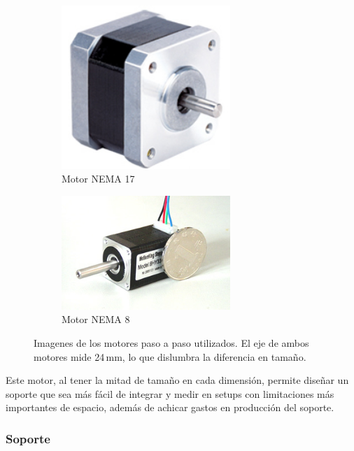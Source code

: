 \begin{figure}[H]
    \begin{subfigure}[b]{0.45\textwidth}
        \centering
        \includegraphics[width=0.7\textwidth]{fig/motor/nema17}
        \caption{Motor NEMA 17}
    \end{subfigure}
    \begin{subfigure}[b]{0.45\textwidth}
    \centering
        \includegraphics[width=0.7\textwidth]{fig/motor/nema8}
        \caption{Motor NEMA 8}
    \end{subfigure}
    \caption{Imagenes de los motores paso a paso utilizados. El eje de ambos motores mide 24$\,$mm, lo que dislumbra la diferencia en tamaño.}
\end{figure}

Este motor, al tener la mitad de tamaño en cada dimensión, permite diseñar un soporte que sea más fácil de integrar y medir en setups con limitaciones más importantes de espacio, además de achicar gastos en producción del soporte.

\subsubsection{Soporte}

